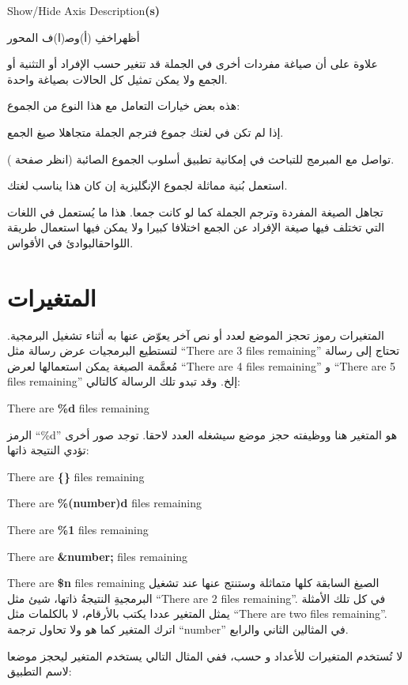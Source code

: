Show/Hide Axis Description{\bf (s)}

أظهر اخفِ (أ)وص‍(ا)ف المحور

علاوة على أن صياغة مفردات أخرى في الجملة قد تتغير حسب الإفراد أو التثنية
أو الجمع ولا يمكن تمثيل كل الحالات بصياغة واحدة.

هذه بعض خيارات التعامل مع هذا النوع من الجموع:

\startitemize[n]
\item إذا لم تكن في لغتك جموع فترجم الجملة متجاهلا صيغ الجمع.
\item تواصل مع المبرمج للتباحث في إمكانية تطبيق أسلوب الجموع الصائبة
(انظر صفحة ).
\item استعمل بُنية مماثلة لجموع الإنگليزية إن كان هذا يناسب لغتك.
\item تجاهل الصيغة المفردة وترجم الجملة كما لو كانت جمعا. هذا ما يُستعمل
في اللغات التي تختلف فيها صيغة الإفراد عن الجمع اختلافا كبيرا ولا يمكن
فيها استعمال طريقة اللواحق البوادئ في الأقواس.
\stopitemize
\section{المتغيرات}
المتغيرات رموز تحجز الموضع لعدد أو
نص آخر يعوّض عنها به أثناء تشغيل البرمجية. لتستطيع البرمجيات عرض رسالة
مثل “There are 3 files remaining” تحتاج إلى رسالة مُعمَّمة الصيغة يمكن
استعمالها لعرض “There are 4 files remaining” و “There are 5 files
remaining” إلخ. وقد تبدو تلك الرسالة كالتالي:

There are {\bf \%d} files remaining

الرمز ‪“\%d”‬ هو المتغير هنا ووظيفته حجز موضع سيشغله العدد لاحقا. توجد
صور أخرى تؤدي النتيجة ذاتها:

\startitemize[1]
\item There are {\bf \{\}} files remaining
\item There are {\bf \%(number)d} files remaining
\item There are {\bf \%1} files remaining
\item There are {\bf \&number;} files remaining
\item There are {\bf \$n} files remaining
\stopitemize
الصيغ السابقة كلها متماثلة وستنتج عنها عند تشغيل البرمجيةِ النتيجةُ
ذاتها، شيئ مثل “There are 2 files remaining”. في كل تلك الأمثلة يمثل
المتغير عددا يكتب بالأرقام، لا بالكلمات مثل “There are two files
remaining”. اترك المتغير كما هو ولا تحاول ترجمة “number” في المثالين
الثاني والرابع.

لا تُستخدم المتغيرات للأعداد و حسب، ففي المثال التالي يستخدم المتغير
ليحجز موضعا لاسم التطبيق:

